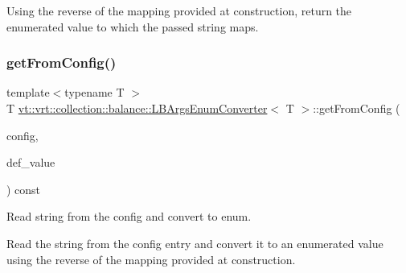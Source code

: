 Using the reverse of the mapping provided at construction, return the enumerated value to which the passed string maps. \mbox{\label{structvt_1_1vrt_1_1collection_1_1balance_1_1_l_b_args_enum_converter_a9297f9943265a526b6790ee6e4b115da}} 
\subsubsection{\texorpdfstring{get\+From\+Config()}{getFromConfig()}}
{\footnotesize\ttfamily template$<$typename T $>$ \\
T \hyperlink{structvt_1_1vrt_1_1collection_1_1balance_1_1_l_b_args_enum_converter}{vt\+::vrt\+::collection\+::balance\+::\+L\+B\+Args\+Enum\+Converter}$<$ T $>$\+::get\+From\+Config (\begin{DoxyParamCaption}\item[{\hyperlink{structvt_1_1vrt_1_1collection_1_1balance_1_1_config_entry}{balance\+::\+Config\+Entry} $\ast$}]{config,  }\item[{T}]{def\+\_\+value }\end{DoxyParamCaption}) const\hspace{0.3cm}{\ttfamily [inline]}}



Read string from the config and convert to enum. 

Read the string from the config entry and convert it to an enumerated value using the reverse of the mapping provided at construction. \mbox{\label{structvt_1_1vrt_1_1collection_1_1balance_1_1_l_b_args_enum_converter_a6080061d0da724543e9f039316176a0a}} 
